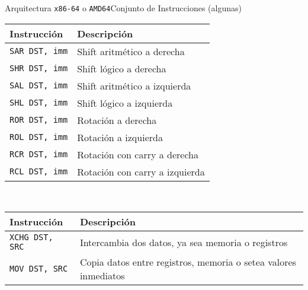 \documentclass[aspectratio=169]{beamer}
\begin{document}

\begin{frame}[fragile]{Arquitectura \texttt{x86-64} o \texttt{AMD64}}{Conjunto de Instrucciones (algunas)}
    \begin{tabular}{p{2.7cm}|p{10cm}}
    Instrucción & Descripción \\ \hline
    \texttt{SAR DST, imm} & \textcolor{verdeuca}{Shift aritmético a derecha     }\\
    \texttt{SHR DST, imm} & \textcolor{verdeuca}{Shift lógico a derecha         }\\
    \texttt{SAL DST, imm} & \textcolor{verdeuca}{Shift aritmético a izquierda   }\\
    \texttt{SHL DST, imm} & \textcolor{verdeuca}{Shift lógico a izquierda       }\\
    \texttt{ROR DST, imm} & \textcolor{verdeuca}{Rotación a derecha             }\\
    \texttt{ROL DST, imm} & \textcolor{verdeuca}{Rotación a izquierda           }\\
    \texttt{RCR DST, imm} & \textcolor{verdeuca}{Rotación con carry a derecha   }\\
    \texttt{RCL DST, imm} & \textcolor{verdeuca}{Rotación con carry a izquierda }\\
    \end{tabular}\\
    \bigskip
    \begin{tabular}{p{2.7cm}|p{10cm}}
    Instrucción & Descripción \\ \hline
    \texttt{XCHG DST, SRC} & \textcolor{verdeuca}{Intercambia dos datos, ya sea memoria o registros}\\
    \texttt{MOV DST, SRC}  & \textcolor{verdeuca}{Copia datos entre registros, memoria o setea valores inmediatos}\\
    \end{tabular}
\end{frame}
\end{document}
